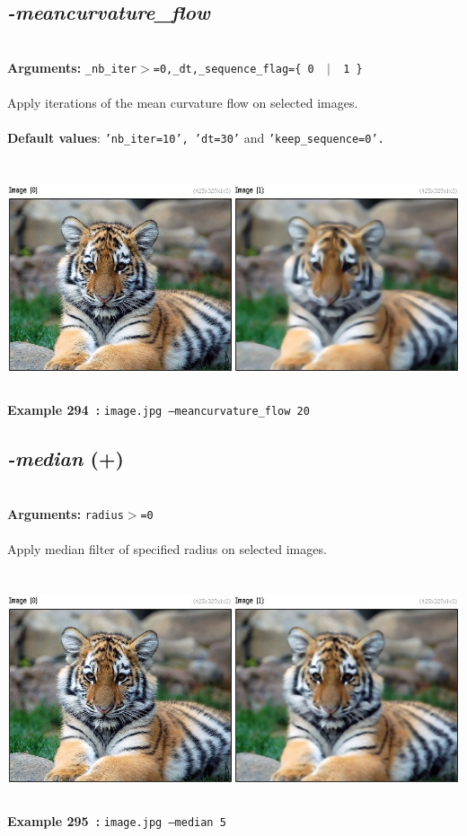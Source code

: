 \documentclass[a4paper,11pt,twoside]{book}
\begin{document}
\subsection{\emph{-meancurvature\_flow} }\vspace*{-0.5em}
~\\\textbf{Arguments: } 
{\small \texttt{\_nb\_iter$>$=0,\_dt,\_sequence\_flag=\{ 0 ~$|$~ 1 \}}}\\~\\
Apply iterations of the mean curvature flow on selected images.
~\\~\\\textbf{Default values}: {\small \texttt{'nb\_iter=10', 'dt=30'} and \texttt{'keep\_sequence=0'.}}
\begin{center}\includegraphics[keepaspectratio=true,height=7cm,width=\textwidth]{img/gmic_def294.jpg}\\
{\footnotesize \textbf{Example 294~:} \texttt{image.jpg --meancurvature\_flow 20}}
\end{center}

\subsection{\emph{-median} (+)}\vspace*{-0.5em}
~\\\textbf{Arguments: } 
{\small \texttt{radius$>$=0}}\\~\\
Apply median filter of specified radius on selected images.
\begin{center}\includegraphics[keepaspectratio=true,height=7cm,width=\textwidth]{img/gmic_def295.jpg}\\
{\footnotesize \textbf{Example 295~:} \texttt{image.jpg --median 5}}
\end{center}
\end{document}
